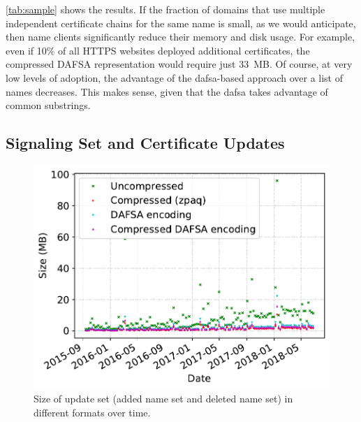 \autoref{tab:sample} shows the results. If the fraction of domains that use
multiple independent certificate chains for the same name is small, as we would
anticipate, then \ac{name} clients significantly reduce their memory and disk
usage. For example, even if 10\% of all HTTPS websites deployed additional
certificates, the compressed DAFSA representation would require just 33~MB. Of
course, at very low levels of adoption, the advantage of the \ac{dafsa}-based
approach over a list of names decreases. This makes sense, given that the
\ac{dafsa} takes advantage of common substrings.

\subsection{Signaling Set and Certificate Updates}
\label{sec:evaluation:updates}


\begin{figure}[t]
  \centering
  \includegraphics[width=0.9\linewidth]{fig/combined_update_size}
  \vspace{-2mm}
  \caption{Size of update set (added name set and deleted name set) in different
  formats over time.}
  \vspace{-5mm}
  \label{fig:updates}
\end{figure}

